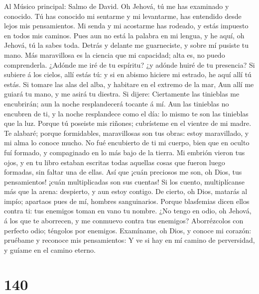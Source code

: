  Al Músico principal: Salmo de David. Oh Jehová, tú me has
examinado y conocido.  Tú has conocido mi sentarme y mi
levantarme, has entendido desde lejos mis pensamientos. 
Mi senda y mi acostarme has rodeado, y estás impuesto en todos mis
caminos.  Pues aun no está la palabra en mi lengua, y he
aquí, oh Jehová, tú la sabes toda.  Detrás y delante me
guarneciste, y sobre mí pusiste tu mano.  Más maravillosa
es la ciencia que mi capacidad; alta es, no puedo comprenderla.
 ¿Adónde me iré de tu espíritu? ¿y adónde huiré de tu
presencia?  Si subiere á los cielos, allí estás tú: y si
en abismo hiciere mi estrado, he aquí allí tú estás.  Si
tomare las alas del alba, y habitare en el extremo de la mar,
 Aun allí me guiará tu mano, y me asirá tu diestra.
 Si dijere: Ciertamente las tinieblas me encubrirán; aun
la noche resplandecerá tocante á mí.  Aun las tinieblas
no encubren de ti, y la noche resplandece como el día: lo mismo te son
las tinieblas que la luz.  Porque tú poseiste mis
riñones; cubrísteme en el vientre de mi madre.  Te
alabaré; porque formidables, maravillosas son tus obras: estoy
maravillado, y mi alma lo conoce mucho.  No fué
encubierto de ti mi cuerpo, bien que en oculto fuí formado, y
compaginado en lo más bajo de la tierra.  Mi embrión
vieron tus ojos, y en tu libro estaban escritas todas aquellas cosas que
fueron luego formadas, sin faltar una de ellas.  Así que
¡cuán preciosos me son, oh Dios, tus pensamientos! ¡cuán multiplicadas
son sus cuentas!  Si los cuento, multiplícanse más que la
arena: despierto, y aun estoy contigo.  De cierto, oh
Dios, matarás al impío; apartaos pues de mí, hombres sanguinarios.
 Porque blasfemias dicen ellos contra ti: tus enemigos
toman en vano tu nombre.  ¿No tengo en odio, oh Jehová, á
los que te aborrecen, y me conmuevo contra tus enemigos? 
Aborrézcolos con perfecto odio; téngolos por enemigos. 
Examíname, oh Dios, y conoce mi corazón: pruébame y reconoce mis
pensamientos:  Y ve si hay en mí camino de perversidad, y
guíame en el camino eterno.

\hypertarget{section-139}{%
\section{140}\label{section-139}}

